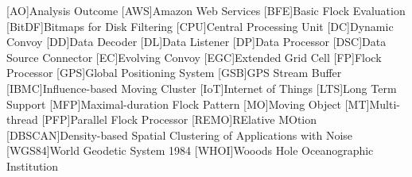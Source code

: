 \begin{acronym}[ACRONYM]
[AO]{Analysis Outcome}
[AWS]{Amazon Web Services}
[BFE]{Basic Flock Evaluation}
[BitDF]{Bitmaps for Disk Filtering}
[CPU]{Central Processing Unit}
[DC]{Dynamic Convoy}
[DD]{Data Decoder}
[DL]{Data Listener}
[DP]{Data Processor}
[DSC]{Data Source Connector}
[EC]{Evolving Convoy}
[EGC]{Extended Grid Cell}
[FP]{Flock Processor}
[GPS]{Global Positioning System}
[GSB]{GPS Stream Buffer}
[IBMC]{Influence-based Moving Cluster}
[IoT]{Internet of Things}
[LTS]{Long Term Support}
[MFP]{Maximal-duration Flock Pattern}
[MO]{Moving Object}
[MT]{Multi-thread}
[PFP]{Parallel Flock Processor}
[REMO]{RElative MOtion}
[DBSCAN]{Density-based Spatial Clustering of Applications with Noise}
[WGS84]{World Geodetic System 1984}
[WHOI]{Wooods Hole Oceanographic Institution}
\end{acronym}
